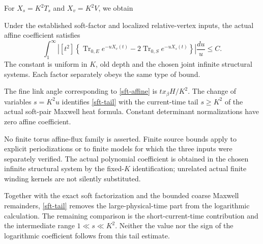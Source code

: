 For \(X_s=K^2T_s\) and \(X_v=K^2V\), we obtain
\begin{theorem}
\label{sft-main}
Under the established soft-factor and localized relative-vertex
inputs, the actual affine coefficient satisfies
\begin{equation}
 \int_1^\infty
  \left|[t^2]\left\{
   \operatorname{Tr}_{0,E}e^{-uX_v(t)}
     -2\operatorname{Tr}_{0,S}e^{-uX_s(t)}
                 \right\}\right|\frac{du}{u}\le C .
 \label{sft-tail}
\end{equation}
The constant is uniform in \(K\), old depth and the chosen joint
infinite structural systems. Each factor separately obeys the same
type of bound.
\end{theorem}

The fine link angle corresponding to \eqref{sft-affine} is
\(t x_\beta H/K^2\). The change of variables \(s=K^2u\)
identifies \eqref{sft-tail} with the current-time tail \(s\ge K^2\)
of the actual soft-pair Maxwell heat formula.
Constant determinant normalizations have zero affine coefficient.

No finite torus affine-flux family is asserted. Finite source bounds
apply to explicit periodizations or to finite models for which the
three inputs were separately verified. The actual polynomial
coefficient is obtained in the chosen infinite structural system by
the fixed-\(K\) identification; unrelated actual finite winding
kernels are not silently substituted.

Together with the exact soft factorization and the bounded coarse
Maxwell remainders, \eqref{sft-tail} removes the large-physical-time
part from the logarithmic calculation. The remaining comparison is
the short-current-time contribution and the intermediate range
\(1\ll s\ll K^2\). Neither the value nor the sign of the logarithmic
coefficient follows from this tail estimate.
